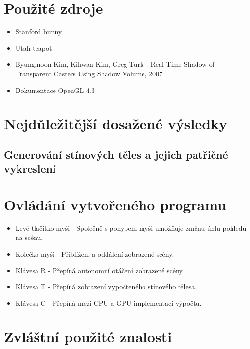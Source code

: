 \documentclass[11pt,a4paper]{article}
\begin{document}
\section{Použité zdroje}
\begin{itemize}
	\item Stanford bunny
	\item Utah teapot
	\item Byungmoon Kim, Kihwan Kim, Greg Turk - Real Time Shadow of Transparent Casters Using Shadow Volume, 2007
	\item Dokumentace OpenGL 4.3
\end{itemize}
\section{Nejdůležitější dosažené výsledky}

\subsection{Generování stínových těles a jejich patřičné vykreslení}


\section{Ovládání vytvořeného programu}

\begin{itemize}
	\item Levé tlačítko myši - Společně s pohybem myši umožňuje změnu úhlu pohledu na scénu.
	\item Kolečko myši - Přiblížení a oddálení zobrazené scény.
	\item Klávesa R - Přepíná autonomní otáčení zobrazené scény.
	\item Klávesa T - Přepíná zobrazení vypočteného stínového tělesa.
	\item Klávesa C - Přepíná mezi CPU a GPU implementací výpočtu.
\end{itemize}

\section{Zvláštní použité znalosti}
\end{document}

